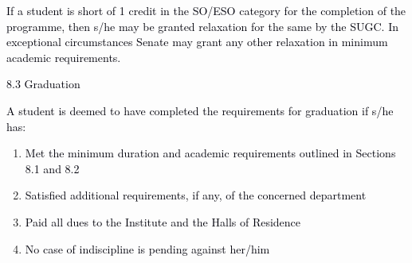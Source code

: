 \documentclass[12pt]{article}
\begin{document}
\vspace{\baselineskip}
\begin{justify}
{\fontsize{10pt}{12.0pt}\selectfont \textcolor[HTML]{00000A}{If a student is short of 1 credit in the SO/ESO category for the completion of the programme, then s/he may be granted relaxation for the same by the SUGC. In exceptional circumstances Senate may grant any other relaxation in minimum academic requirements.}\par}
\end{justify}\par


\vspace{\baselineskip}
\textcolor[HTML]{00000A}{8.3 Graduation}\par


\vspace{\baselineskip}
{\fontsize{10pt}{12.0pt}\selectfont \textcolor[HTML]{00000A}{A student is deemed to have completed the requirements for graduation if s/he has:}\par}\par


\vspace{\baselineskip}
\begin{enumerate}
	\item {\fontsize{10pt}{12.0pt}\selectfont \textcolor[HTML]{00000A}{Met the minimum duration and academic requirements outlined in Sections 8.1 and 8.2}\par}\par


\vspace{\baselineskip}
	\item {\fontsize{10pt}{12.0pt}\selectfont \textcolor[HTML]{00000A}{Satisfied additional requirements, if any, of the concerned department}\par}\par


\vspace{\baselineskip}
	\item {\fontsize{10pt}{12.0pt}\selectfont \textcolor[HTML]{00000A}{Paid all dues to the Institute and the Halls of Residence}\par}\par


\vspace{\baselineskip}
	\item {\fontsize{10pt}{12.0pt}\selectfont \textcolor[HTML]{00000A}{No case of indiscipline is pending against her/him}\par}
\end{enumerate}\par
\end{document}
